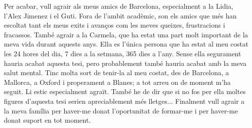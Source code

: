 {%
Per acabar, vull agrair als meus amics de Barcelona, especialment a la Lidia,
l'Alex Jimenez i el Guti. Fora de l'ambit acadèmic, son els amics que més han
escoltat tant els meus exits i avanços com les meves queixes, frustracions i
fracassos. També agrair a la Carmela, que ha estat una part molt important de
la meva vida durant aquests anys. Ella es l'única persona que ha estat al meu
costat les 24 hores del dia, 7 dies a la setmana, 365 dies a l'any. Sense ella
segurament hauria acabat aquesta tesi, pero probablement també hauria acabat
amb la meva salut mental. Tinc molta sort de tenir-la al meu costat, des de
Barcelona, a Mallorca, a Oxford i properament a Blanes; a tot arreu on de
moment m'ha seguit. Li estic especialment agraït. També he de dir que si no fos
per ella moltes figures d'aquesta tesi serien apreciablement més lletges...
Finalment vull agrair a la meva família per haver-me donat l'oportunitat de
formar-me i per haver-me donat suport en tot moment.
}

\vfill